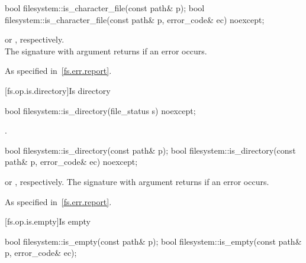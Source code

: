 %
\begin{itemdecl}
bool filesystem::is_character_file(const path& p);
bool filesystem::is_character_file(const path& p, error_code& ec) noexcept;
\end{itemdecl}

\begin{itemdescr}
\pnum
\returns
{}
  or ,
  respectively.\\The signature with argument  returns 
  if an error occurs.

\pnum
\throws
As specified in~\ref{fs.err.report}.
\end{itemdescr}


[fs.op.is.directory]{Is directory}

%
\begin{itemdecl}
bool filesystem::is_directory(file_status s) noexcept;
\end{itemdecl}

\begin{itemdescr}
\pnum
\returns
{}.
\end{itemdescr}

%
\begin{itemdecl}
bool filesystem::is_directory(const path& p);
bool filesystem::is_directory(const path& p, error_code& ec) noexcept;
\end{itemdecl}

\begin{itemdescr}
\pnum
\returns
{} or ,
  respectively. The signature with argument
   returns  if an error occurs.

\pnum
\throws
As specified in~\ref{fs.err.report}.
\end{itemdescr}


[fs.op.is.empty]{Is empty}

%
\begin{itemdecl}
bool filesystem::is_empty(const path& p);
bool filesystem::is_empty(const path& p, error_code& ec);
\end{itemdecl}

